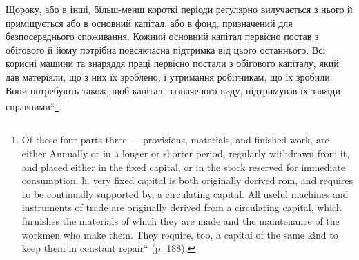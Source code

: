 \parcont{}  %
Щороку, або в інші, більш-менш короткі періоди регулярно вилучається
з нього й приміщується або в основний капітал, або в фонд, призначений
для безпосереднього споживання. Кожний основний капітал первісно
постав з обігового й йому потрібна повсякчасна підтримка від цього
останнього. Всі корисні машини та знаряддя праці первісно постали з
обігового капіталу, який дав матеріяли, що з них їх зроблено, і утримання
робітникам, що їх зробили. Вони потребують також, щоб капітал,
зазначеного виду, підтримував їх завжди справними“\footnote*{
Of these four parts three — provisions, materials, and finished work, are either
Annually or in a longer or shorter period, regularly withdrawn from it, and placed
either in the fixed capital, or in the stock reserved for immediate consumption.
h. very fixed capital is both originally derived rom, and requires to be continually
supported by, a circulating capital. All useful machines and instruments of trade are
originally derived from a circulating capital, which furnishes the materials of which
they are made and the maintenance of the workmen who make them. They require,
too, a capitai of the same kind to keep them in constant repair“ (p. 188).
}.

